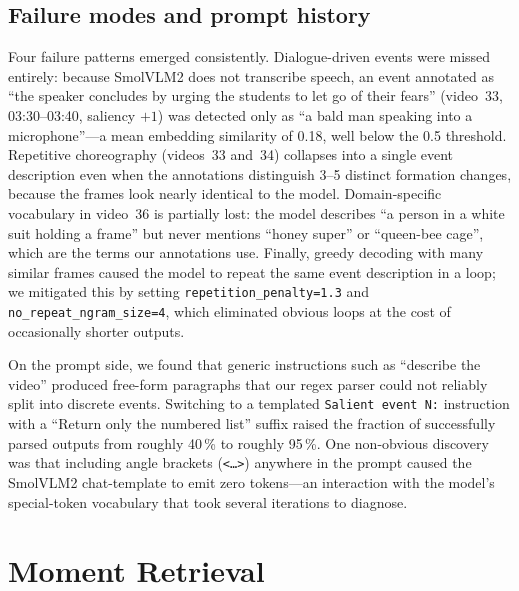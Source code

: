 \documentclass[sigconf, nonacm]{acmart}
\begin{document}
\subsection*{Failure modes and prompt history}

Four failure patterns emerged consistently. Dialogue-driven events were
missed entirely: because SmolVLM2 does not transcribe speech, an event
annotated as ``the speaker concludes by urging the students to let go
of their fears'' (video~33, 03:30--03:40, saliency $+1$) was detected
only as ``a bald man speaking into a microphone''---a mean embedding
similarity of 0.18, well below the 0.5 threshold. Repetitive choreography
(videos~33 and~34) collapses into a single event description even when
the annotations distinguish 3--5 distinct formation changes, because the
frames look nearly identical to the model. Domain-specific vocabulary in
video~36 is partially lost: the model describes ``a person in a white suit
holding a frame'' but never mentions ``honey super'' or ``queen-bee cage'',
which are the terms our annotations use. Finally, greedy decoding with many
similar frames caused the model to repeat the same event description in a
loop; we mitigated this by setting \texttt{repetition\_penalty=1.3} and
\texttt{no\_repeat\_ngram\_size=4}, which eliminated obvious loops at the
cost of occasionally shorter outputs.

On the prompt side, we found that generic instructions such as ``describe
the video'' produced free-form paragraphs that our regex parser could not
reliably split into discrete events. Switching to a templated
\texttt{Salient event N:} instruction with a ``Return only the numbered
list'' suffix raised the fraction of successfully parsed outputs from
roughly 40\,\% to roughly 95\,\%. One non-obvious discovery was that
including angle brackets (\texttt{<\ldots>}) anywhere in the prompt caused
the SmolVLM2 chat-template to emit zero tokens---an interaction with the
model's special-token vocabulary that took several iterations to diagnose.

\section{Moment Retrieval}
\label{sec:mr}
\end{document}
